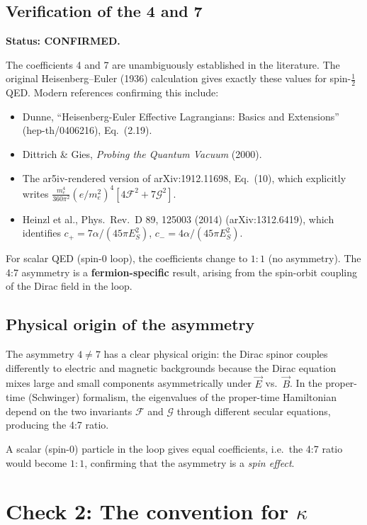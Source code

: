\documentclass[12pt]{article}
\newcommand{\vE}{\vec{E}}
\newcommand{\vB}{\vec{B}}
\begin{document}
\subsection{Verification of the 4 and 7}

\textbf{Status: CONFIRMED.}

The coefficients 4 and 7 are unambiguously established in the
literature.  The original Heisenberg--Euler (1936) calculation gives
exactly these values for spin-$\tfrac{1}{2}$ QED.  Modern references
confirming this include:
\begin{itemize}
\item Dunne, ``Heisenberg-Euler Effective Lagrangians: Basics and
  Extensions'' (hep-th/0406216), Eq.~(2.19).
\item Dittrich \& Gies, \textit{Probing the Quantum Vacuum} (2000).
\item The ar5iv-rendered version of arXiv:1912.11698, Eq.~(10),
  which explicitly writes
  $\tfrac{m_e^4}{360\pi^2}(e/m_e^2)^4[4\mathcal{F}^2 +
  7\mathcal{G}^2]$.
\item Heinzl et al., Phys.\ Rev.\ D 89, 125003 (2014)
  (arXiv:1312.6419), which identifies $c_+ = 7\alpha/(45\pi E_S^2)$,
  $c_- = 4\alpha/(45\pi E_S^2)$.
\end{itemize}

For scalar QED (spin-0 loop), the coefficients change to $1:1$
(no asymmetry).  The 4:7 asymmetry is a \textbf{fermion-specific}
result, arising from the spin-orbit coupling of the Dirac field
in the loop.

\subsection{Physical origin of the asymmetry}

The asymmetry $4 \neq 7$ has a clear physical origin: the Dirac
spinor couples differently to electric and magnetic backgrounds
because the Dirac equation mixes large and small components
asymmetrically under $\vE$ vs.\ $\vB$.  In the proper-time
(Schwinger) formalism, the eigenvalues of the proper-time
Hamiltonian depend on the two invariants $\mathcal{F}$ and
$\mathcal{G}$ through different secular equations, producing the
4:7 ratio.

A scalar (spin-0) particle in the loop gives equal coefficients,
i.e.\ the 4:7 ratio would become $1:1$, confirming that the
asymmetry is a \emph{spin effect}.

\section{Check 2: The convention for $\kappa$}
\end{document}
